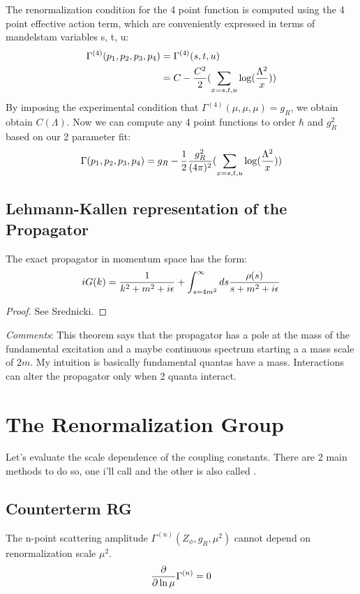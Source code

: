 \documentclass[11pt]{scrartcl}
\begin{document}
The renormalization condition for the 4 point function is computed using the 4 point effective action term, which are conveniently expressed
in terms of mandelstam variables s, t, u:
\begin{align}
\Gamma^{(4)}(p_1, p_2, p_3, p_4) & = \Gamma^{(4)}(s, t, u) \\
& = C - {C^2 \over 2} (\sum_{x = s, t, u} \log({\Lambda^2 \over x}))
\end{align}
By imposing the experimental condition that $\Gamma^(4)(\mu, \mu, \mu) = g_R$, we obtain obtain $C(\Lambda)$.
Now we can compute any 4 point functions to order $\hbar$ and $g_R^2$ based on our 2 parameter fit:
\begin{align}
\Gamma(p_1, p_2, p_3, p_4) = g_R - {1 \over 2} {g_R^2 \over (4 \pi)^2} (\sum_{x = s, t, u} \log({\Lambda^2 \over x}))
\end{align}

\subsection{Lehmann-Kallen representation of the Propagator}
\begin{theorem}
The exact propagator in momentum space has the form:
\begin{align}
i G(k) = {1 \over k^2 + m^2 + i \epsilon} + \int_{s = 4 m^2}^\infty ds {\rho(s) \over s + m^2 + i \epsilon}
\end{align}
\end{theorem}

\begin{proof}
See Srednicki.
\end{proof}
\emph{Comments}:
This theorem says that the propagator has a pole at the mass of the fundamental excitation and a maybe continuous spectrum starting a a mass scale of $2m$.
My intuition is basically fundamental quantas have a mass. Interactions can alter the propagator only when 2 quanta interact.



\section{The Renormalization Group}
Let's evaluate the scale dependence of the coupling constants.  There are 2 main methods to do so, one i'll call  and the other is  also called .

\subsection{Counterterm RG}
The n-point scattering amplitude $\Gamma^{(n)} (Z_\phi, g_R, \mu^2)$ cannot depend on renormalization scale $\mu^2$.  
\begin{align}
	{\partial \over \partial \ln \mu} \Gamma^{(n)} = 0
	\end{align}
\end{document}
